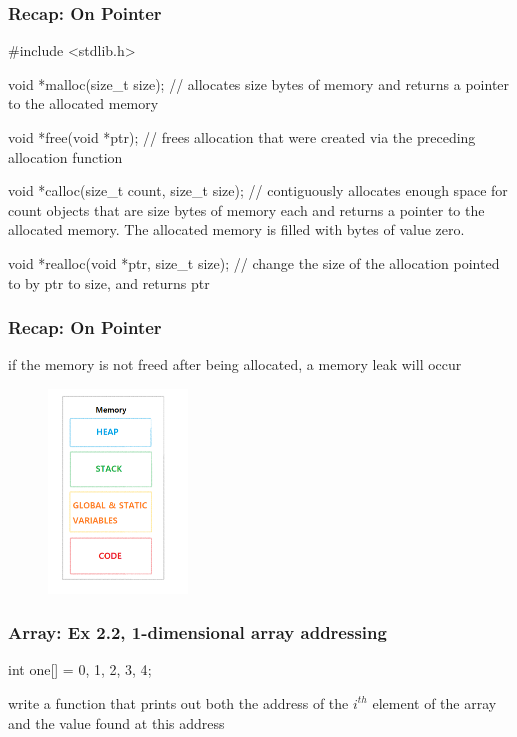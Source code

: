 \documentclass[newPxFont,sthlmFooter,nooffset]{beamer}
\begin{document}
\begin{frame}[t, fragile]
  \frametitle{Recap: On Pointer}
\begin{codedef}
#include <stdlib.h>

void *malloc(size_t size); // allocates size bytes of memory and returns a pointer to the allocated memory

void *free(void *ptr); // frees allocation that were created via the preceding allocation function

void *calloc(size_t count, size_t size); // contiguously allocates enough space for count objects that are size bytes of memory each and returns a pointer to the allocated memory. The allocated memory is filled with bytes of value zero.

void *realloc(void *ptr, size_t size); // change the size of the allocation pointed to by ptr to size, and returns ptr
\end{codedef}

\end{frame}
\begin{frame}
	\frametitle{Recap: On Pointer}
if the memory is not freed after being allocated, a memory leak will occur

\begin{figure}[h]
	\centering
	\includegraphics[width=0.33\textwidth]{figures/fig03_memory.png}
\end{figure}
\end{frame}


\begin{frame}[t, fragile]
  \frametitle{Array: Ex 2.2, 1-dimensional array addressing}
\begin{codedef}
int one[] = {0, 1, 2, 3, 4};   
\end{codedef}

write a function that prints out both the address of the $i^{th}$ element of the array and the value found at this address

\end{frame}
\end{document}
